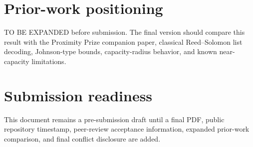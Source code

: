 \documentclass[11pt]{article}
\begin{document}
\section{Prior-work positioning}
TO BE EXPANDED before submission. The final version should compare this result with the Proximity Prize companion paper, classical Reed--Solomon list decoding, Johnson-type bounds, capacity-radius behavior, and known near-capacity limitations.
\section{Submission readiness}
This document remains a pre-submission draft until a final PDF, public repository timestamp, peer-review acceptance information, expanded prior-work comparison, and final conflict disclosure are added.
\end{document}
